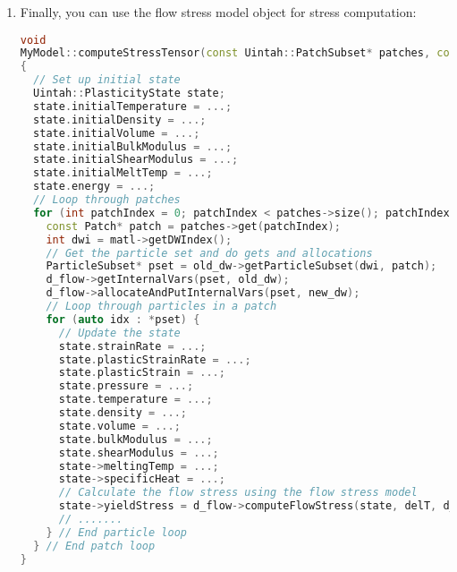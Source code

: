 \begin{enumerate}
  \item Finally, you can use the flow stress model object for stress computation:
\begin{lstlisting}[language=Cpp]
void
MyModel::computeStressTensor(const Uintah::PatchSubset* patches, const Uintah::MPMMaterial* matl, Uintah::DataWarehouse* old_dw, Uintah::DataWarehouse* new_dw)
{
  // Set up initial state
  Uintah::PlasticityState state;
  state.initialTemperature = ...;
  state.initialDensity = ...;
  state.initialVolume = ...;
  state.initialBulkModulus = ...;
  state.initialShearModulus = ...;
  state.initialMeltTemp = ...;
  state.energy = ...;
  // Loop through patches
  for (int patchIndex = 0; patchIndex < patches->size(); patchIndex++) {
    const Patch* patch = patches->get(patchIndex);
    int dwi = matl->getDWIndex();
    // Get the particle set and do gets and allocations
    ParticleSubset* pset = old_dw->getParticleSubset(dwi, patch);
    d_flow->getInternalVars(pset, old_dw);
    d_flow->allocateAndPutInternalVars(pset, new_dw);
    // Loop through particles in a patch
    for (auto idx : *pset) {
      // Update the state
      state.strainRate = ...;
      state.plasticStrainRate = ...;
      state.plasticStrain = ...;
      state.pressure = ...;
      state.temperature = ...;
      state.density = ...;
      state.volume = ...;
      state.bulkModulus = ...;
      state.shearModulus = ...;
      state->meltingTemp = ...;
      state->specificHeat = ...;
      // Calculate the flow stress using the flow stress model
      state->yieldStress = d_flow->computeFlowStress(state, delT, d_tol, matl, idx);
      // .......
    } // End particle loop
  } // End patch loop
}
\end{lstlisting}
\end{enumerate}

